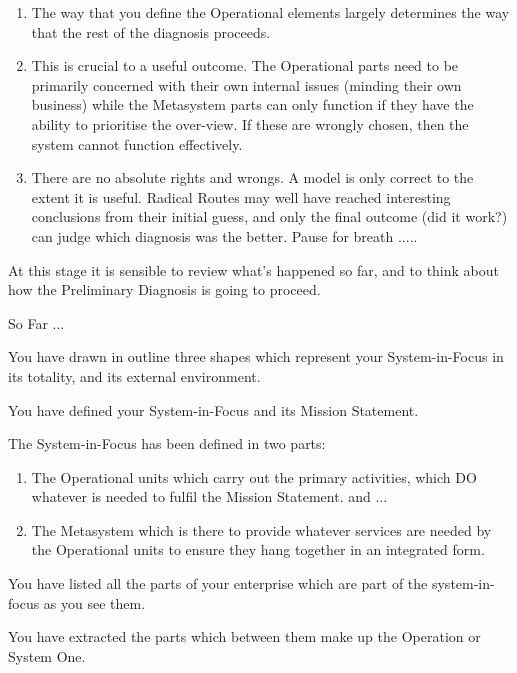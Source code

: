\begin{enumerate}
  \item The way that you define the Operational elements largely determines the way that the rest of the diagnosis proceeds.

  \item This is crucial to a useful outcome. The Operational parts need to be primarily concerned with their own internal issues (minding their own business) while the Metasystem parts can only function if they have the ability to prioritise the over-view. If these are wrongly chosen, then the system cannot function effectively.

  \item There are no absolute rights and wrongs. A model is only correct to the extent it is useful. Radical Routes may well have reached interesting conclusions from their initial guess, and only the final outcome (did it work?) can judge which diagnosis was the better. Pause for breath .....

\end{enumerate}

At this stage it is sensible to review what's happened so far, and to think about how the Preliminary Diagnosis is going to proceed.

So Far ...

You have drawn in outline three shapes which represent your System-in-Focus in its totality, and its external environment.

You have defined your System-in-Focus and its Mission Statement.

The System-in-Focus has been defined in two parts:

\begin{enumerate}
  \item The Operational units which carry out the primary activities, which DO whatever is needed to fulfil the Mission Statement. and ...

  \item The Metasystem which is there to provide whatever services are needed by the Operational units to ensure they hang together in an integrated form.

\end{enumerate}

You have listed all the parts of your enterprise which are part of the system-in-focus as you see them.

You have extracted the parts which between them make up the Operation or System One.

